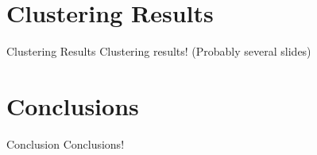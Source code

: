 \documentclass[12pt]{beamer}
\begin{document}
\section{Clustering Results}
\begin{frame}{Clustering Results}
Clustering results!
(Probably several slides)
\end{frame}

\section{Conclusions}
\begin{frame}{Conclusion}
Conclusions!
\end{frame}
\end{document}
